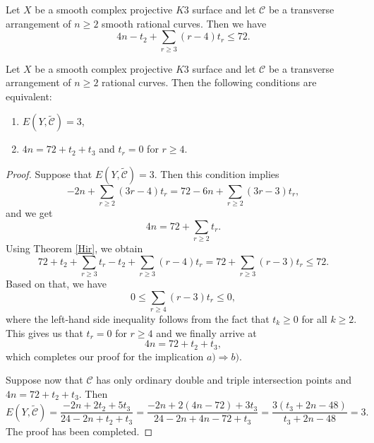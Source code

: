\documentclass[10pt,a4paper]{amsart}
\begin{document}
\begin{theorem}
\label{Hir}
Let $X$ be a smooth complex projective $K3$ surface and let $\mathcal{C}$ be a transverse arrangement  of $n\geq 2$ smooth rational curves. Then we have
\begin{equation}
4n - t_{2} + \sum_{r\geq 3}(r-4)t_{r} \leq 72.
\end{equation}
\end{theorem}

\begin{theorem}
\label{bl}
Let $X$ be a smooth complex projective $K3$ surface and let $\mathcal{C}$ be a transverse arrangement of $n\geq 2$ rational curves. Then the following conditions are equivalent:
\begin{enumerate}
\item[a)] $E(Y,\widetilde{\mathcal{C}}) = 3$, 
\item[b)] $4n = 72 + t_{2}+t_{3}$ and $t_{r}=0$ for $r\geq 4$.
\end{enumerate}
\end{theorem}

\begin{proof}
Suppose that $E(Y,\widetilde{\mathcal{C}}) = 3$. Then this condition implies
\[-2n + \sum_{r\geq 2}(3r-4)t_{r} = 72 - 6n + \sum_{r\geq 2}(3r-3)t_{r},\]
and we get
\[4n = 72 + \sum_{r\geq 2}t_{r}.\]
Using Theorem \ref{Hir}, we obtain
\[72 + t_{2} + \sum_{r\geq 3} t_{r} - t_{2} + \sum_{r\geq 3}(r-4)t_{r} = 72 + \sum_{r\geq 3}(r-3)t_{r} \leq 72.\]
Based on that, we have 
\[0 \leq \sum_{r\geq 4}(r-3)t_{r} \leq 0,\]
where the left-hand side inequality follows from the fact that $t_{k}\geq 0$ for all $k\geq 2$. This gives us that $t_{r} = 0$ for $r\geq 4$ and we finally arrive at
\[4n = 72 +t_{2}+t_{3},\]
which completes our proof for the implication $a) \Rightarrow b)$.

Suppose now that $\mathcal{C}$ has only ordinary double and triple intersection points and $4n=72+t_{2}+t_{3}$. Then
\[E(Y,\widetilde{\mathcal{C}}) = \frac{-2n + 2t_{2}+5t_{3}}{24 -2n + t_{2}+t_{3}} = \frac{-2n + 2(4n-72)+3t_{3}}{24 -2n + 4n-72 + t_{3}} = \frac{3(t_{3}+2n-48)}{t_{3}+2n-48} = 3.\]
The proof has been completed.
\end{proof}
\end{document}

